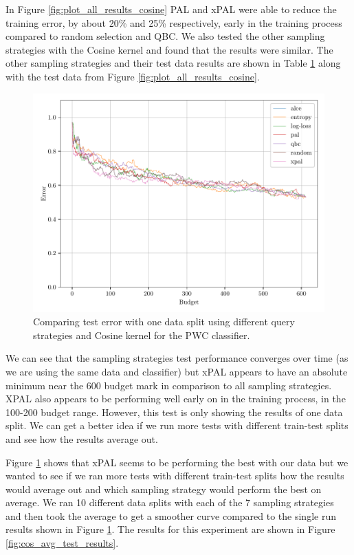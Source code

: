 In Figure \ref{fig:plot_all_results_cosine} PAL and xPAL were able to reduce the training error, by about 20\% and 25\% respectively, early in the training process compared to random selection and QBC. We also tested the other sampling strategies with the Cosine kernel and found that the results were similar. The other sampling strategies and their test data results are shown in Table \ref{fig:cos_test_results} along with the test data from Figure \ref{fig:plot_all_results_cosine}. 


\begin{figure}[ht]
    \centering
    \includegraphics[width=\scale\textwidth]{../img/plot_kernel_cos_test_results.pdf}
    \caption{Comparing test error with one data split using different query strategies and Cosine kernel for the PWC classifier.}
    \label{fig:cos_test_results}
\end{figure}

We can see that the sampling strategies test performance converges over time (as we are using the same data and classifier) but xPAL appears to have an absolute minimum near the 600 budget mark in comparison to all sampling strategies. XPAL also appears to be performing well early on in the training process, in the 100-200 budget range. However, this test is only showing the results of one data split. We can get a better idea if we run more tests with different train-test splits and see how the results average out.

Figure \ref{fig:cos_test_results} shows that xPAL seems to be performing the best with our data but we wanted to see if we ran more tests with different train-test splits how the results would average out and which sampling strategy would perform the best on average. We ran 10 different data splits with each of the 7 sampling strategies and then took the average to get a smoother curve compared to the single run results shown in Figure \ref*{fig:cos_test_results}. The results for this experiment are shown in Figure \ref{fig:cos_avg_test_results}. 

